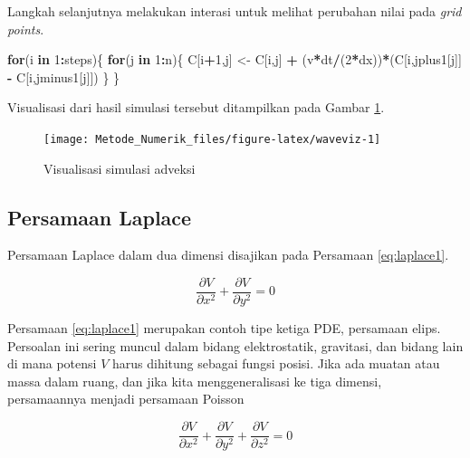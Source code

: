 \documentclass[]{book}
\newenvironment{Shaded}{\begin{snugshade}}{\end{snugshade}}
\newcommand{\ControlFlowTok}[1]{\textcolor[rgb]{0.13,0.29,0.53}{\textbf{#1}}}
\newcommand{\DecValTok}[1]{\textcolor[rgb]{0.00,0.00,0.81}{#1}}
\newcommand{\NormalTok}[1]{#1}
\newcommand{\OperatorTok}[1]{\textcolor[rgb]{0.81,0.36,0.00}{\textbf{#1}}}
\newcommand{\StringTok}[1]{\textcolor[rgb]{0.31,0.60,0.02}{#1}}
\theoremstyle{definition}
\theoremstyle{definition}
\theoremstyle{definition}
\theoremstyle{remark}
\begin{document}
Langkah selanjutnya melakukan interasi untuk melihat perubahan nilai pada \emph{grid points}.

\begin{Shaded}
\begin{Highlighting}[]
\ControlFlowTok{for}\NormalTok{(i }\ControlFlowTok{in} \DecValTok{1}\OperatorTok{:}\NormalTok{steps)\{}
  \ControlFlowTok{for}\NormalTok{(j }\ControlFlowTok{in} \DecValTok{1}\OperatorTok{:}\NormalTok{n)\{}
\NormalTok{    C[i}\OperatorTok{+}\DecValTok{1}\NormalTok{,j] <-}\StringTok{ }\NormalTok{C[i,j] }\OperatorTok{+}\StringTok{ }\NormalTok{(v}\OperatorTok{*}\NormalTok{dt}\OperatorTok{/}\NormalTok{(}\DecValTok{2}\OperatorTok{*}\NormalTok{dx))}\OperatorTok{*}\NormalTok{(C[i,jplus1[j]] }\OperatorTok{-}\StringTok{ }\NormalTok{C[i,jminus1[j]])}
\NormalTok{  \}}
\NormalTok{\}}
\end{Highlighting}
\end{Shaded}

Visualisasi dari hasil simulasi tersebut ditampilkan pada Gambar \ref{fig:waveviz}.

\begin{figure}

{\centering \texttt{[image: Metode\_Numerik\_files/figure-latex/waveviz-1]} 

}

\caption{Visualisasi simulasi adveksi}\label{fig:waveviz}
\end{figure}

\hypertarget{laplace}{%
\subsection{Persamaan Laplace}\label{laplace}}

Persamaan Laplace dalam dua dimensi disajikan pada Persamaan \eqref{eq:laplace1}.

\begin{equation}
\frac{\partial V}{\partial x^2}+\frac{\partial V}{\partial y^2}=0
  \label{eq:laplace1}
\end{equation}

Persamaan \eqref{eq:laplace1} merupakan contoh tipe ketiga PDE, persamaan elips. Persoalan ini sering muncul dalam bidang elektrostatik, gravitasi, dan bidang lain di mana potensi \(V\) harus dihitung sebagai fungsi posisi. Jika ada muatan atau massa dalam ruang, dan jika kita menggeneralisasi ke tiga dimensi, persamaannya menjadi persamaan Poisson

\begin{equation}
\frac{\partial V}{\partial x^2}+\frac{\partial V}{\partial y^2}+\frac{\partial V}{\partial z^2}=0
  \label{eq:laplace2}
\end{equation}
\end{document}
